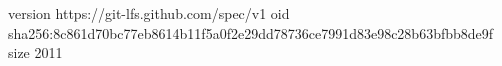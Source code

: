 version https://git-lfs.github.com/spec/v1
oid sha256:8c861d70bc77eb8614b11f5a0f2e29dd78736ce7991d83e98c28b63bfbb8de9f
size 2011
